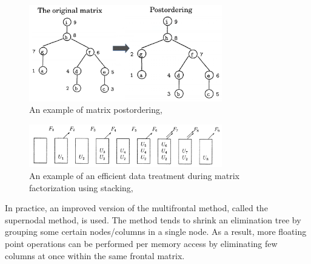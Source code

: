 

\begin{figure}[!htpb]
  \centering
  \includegraphics[width=0.75\textwidth]{figures/chapter-2/elimination-tree-mm-postordering.png}
\caption[An example of matrix postordering]{An example of matrix postordering, \cite{mult-frontal-original:2}}
\label{fig:mm-matrix-postordering}
\end{figure}


\begin{figure}[!htpb]
  \centering
  \includegraphics[width=0.75\textwidth]{figures/chapter-2/mm-contrib-matrix-manipulation.png}
\caption[An example of an efficient data treatment during matrix factorization using stacking]{An example of an efficient data treatment during matrix factorization using stacking, \cite{mult-frontal-original:2}}
\label{fig:mm-contrib-matrix-manipulation}
\end{figure}


In practice, an improved version of the multifrontal method, called the supernodal method, is used. The method tends to shrink an elimination tree by grouping some certain nodes/columns in a single node. As a result, more floating point operations can be performed per memory access by eliminating few columns at once within the same frontal matrix.\\





